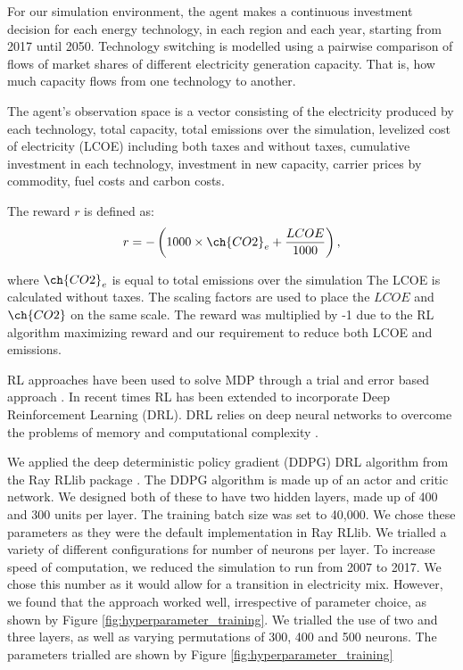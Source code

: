 \documentclass{article}
\begin{document}
For our simulation environment, the agent makes a continuous investment decision for each energy technology, in each region and each year, starting from 2017 until 2050. 	Technology switching is modelled using a pairwise comparison of flows of market shares of different electricity generation capacity. That is, how much capacity flows from one technology to another. 

The agent's observation space is a vector consisting of the electricity produced by each technology, total capacity, total  emissions over the simulation, levelized cost of electricity (LCOE) including both taxes and without taxes, cumulative investment in each technology, investment in new capacity, carrier prices by commodity, fuel costs and carbon costs.

The reward $r$ is defined as:
\begin{equation}
\label{eq:reward_function}
	r = -\left(1000\times\ch{CO2}_e + \frac{LCOE}{1000}\right),
\end{equation}

where $\ch{CO2}_e$ is equal to total  emissions over the simulation The LCOE is calculated without taxes. The scaling factors are used to place the $LCOE$ and $\ch{CO2}$ on the same scale. The reward was multiplied by -1 due to the RL algorithm maximizing reward and our requirement to reduce both LCOE and  emissions.


RL approaches have been used to solve MDP through a trial and error based approach \cite{Sutton2015}. In recent times RL has been extended to incorporate Deep Reinforcement Learning (DRL). DRL relies on deep neural networks to overcome the problems of memory and computational complexity \cite{Arulkumaran2017}. 

We applied the deep deterministic policy gradient (DDPG) DRL algorithm \cite{Hunt2016a} from the Ray RLlib package \cite{Liang2014}. The DDPG algorithm is made up of an actor and critic network. We designed both of these to have two hidden layers, made up of 400 and 300 units per layer. The training batch size was set to 40,000. We chose these parameters as they were the default implementation in Ray RLlib. We trialled a variety of different configurations for number of neurons per layer. To increase speed of computation, we reduced the simulation to run from 2007 to 2017. We chose this number as it would allow for a transition in electricity mix. However, we found that the approach worked well, irrespective of parameter choice, as shown by Figure \ref{fig:hyperparameter_training}. We trialled the use of two and three layers, as well as varying permutations of 300, 400 and 500 neurons. The parameters trialled are shown by Figure \ref{fig:hyperparameter_training}
\end{document}
